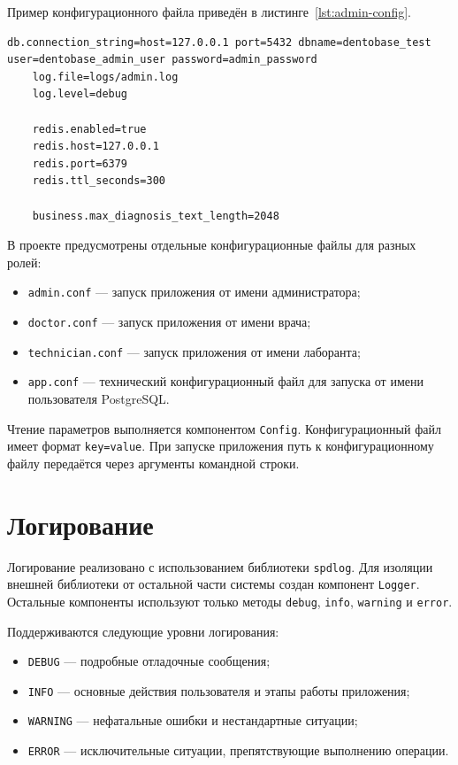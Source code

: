 Пример конфигурационного файла приведён в листинге~\ref{lst:admin-config}.

\clearpage

\begin{lstlisting}[caption={Пример конфигурационного файла администратора}, label={lst:admin-config}]
	db.connection_string=host=127.0.0.1 port=5432 dbname=dentobase_test user=dentobase_admin_user password=admin_password
	log.file=logs/admin.log
	log.level=debug
	
	redis.enabled=true
	redis.host=127.0.0.1
	redis.port=6379
	redis.ttl_seconds=300
	
	business.max_diagnosis_text_length=2048
\end{lstlisting}

В проекте предусмотрены отдельные конфигурационные файлы для разных ролей:

\begin{itemize}
	\item \texttt{admin.conf} --- запуск приложения от имени администратора;
	\item \texttt{doctor.conf} --- запуск приложения от имени врача;
	\item \texttt{technician.conf} --- запуск приложения от имени лаборанта;
	\item \texttt{app.conf} --- технический конфигурационный файл для запуска от имени пользователя PostgreSQL.
\end{itemize}

Чтение параметров выполняется компонентом \texttt{Config}. Конфигурационный файл имеет формат \texttt{key=value}. При запуске приложения путь к конфигурационному файлу передаётся через аргументы командной строки.

\section{Логирование}

Логирование реализовано с использованием библиотеки \texttt{spdlog}. Для изоляции внешней библиотеки от остальной части системы создан компонент \texttt{Logger}. Остальные компоненты используют только методы \texttt{debug}, \texttt{info}, \texttt{warning} и \texttt{error}.

Поддерживаются следующие уровни логирования:

\begin{itemize}
	\item \texttt{DEBUG} --- подробные отладочные сообщения;
	\item \texttt{INFO} --- основные действия пользователя и этапы работы приложения;
	\item \texttt{WARNING} --- нефатальные ошибки и нестандартные ситуации;
	\item \texttt{ERROR} --- исключительные ситуации, препятствующие выполнению операции.
\end{itemize}

